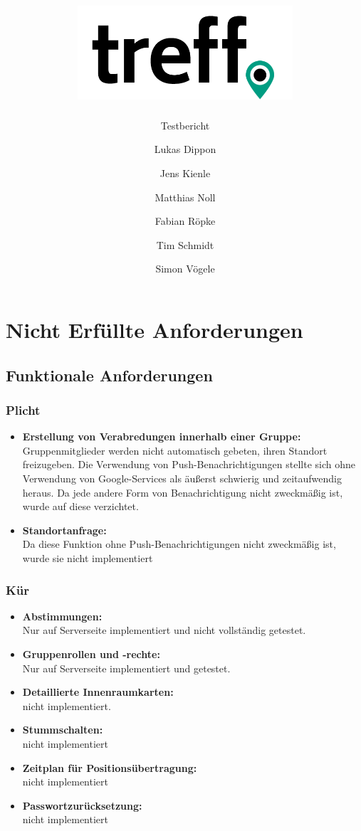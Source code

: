 \documentclass[parskip=full,11pt]{scrartcl}
\title{\includegraphics[width = 80mm]{images/logo_crop.png}}
\subtitle{\huge Testbericht}
\author{Lukas Dippon
        \and Jens Kienle
        \and Matthias Noll
        \and Fabian Röpke
        \and Tim Schmidt
        \and Simon Vögele}
\begin{document}
\maketitle
\thispagestyle{empty} %

\pagebreak
\tableofcontents

\pagebreak
\section{Nicht Erfüllte Anforderungen}
	\subsection{Funktionale Anforderungen}
		\subsubsection{Plicht}
			\begin{itemize}
                \item \textbf{Erstellung von Verabredungen innerhalb einer Gruppe:}\\
							\label{notification}Gruppenmitglieder werden nicht automatisch
							gebeten, ihren Standort freizugeben. Die Verwendung von
							Push-Benachrichtigungen stellte sich ohne Verwendung von
							Google-Services als äußerst schwierig und zeitaufwendig heraus.
							Da jede andere Form von Benachrichtigung nicht zweckmäßig ist,
							wurde auf diese verzichtet.
                \item \textbf{Standortanfrage:}\\
							\label{requestPosition}Da diese Funktion ohne
							Push-Benachrichtigungen nicht zweckmäßig ist,
							wurde sie nicht implementiert
			\end{itemize}

		\subsubsection{Kür}
			\begin{itemize}
                \item \textbf{Abstimmungen:}\\
							Nur auf Serverseite implementiert und nicht vollständig getestet.
                \item \textbf{Gruppenrollen und -rechte:}\\
							Nur auf Serverseite implementiert und getestet.
                \item \textbf{Detaillierte Innenraumkarten:}\\
							nicht implementiert.
                \item \textbf{Stummschalten:}\\
							nicht implementiert
                \item \textbf{Zeitplan für Positionsübertragung:}\\
							nicht implementiert
                \item \textbf{Passwortzurücksetzung:}\\
							nicht implementiert
			\end{itemize}
\end{document}
